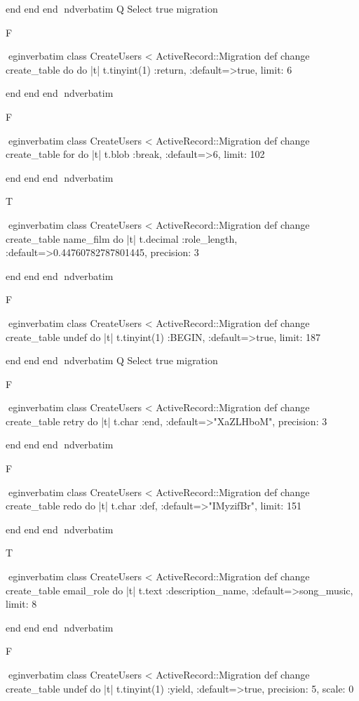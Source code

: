     end 
  end 
end
nd{verbatim}
Q
 Select true migration

F

egin{verbatim}
 class CreateUsers < ActiveRecord::Migration 
  def change 
    create_table do do |t| 
      t.tinyint(1) :return, :default=>true, limit: 6
    
    end 
  end 
end
nd{verbatim}

F

egin{verbatim}
 class CreateUsers < ActiveRecord::Migration 
  def change 
    create_table for do |t| 
      t.blob :break, :default=>6, limit: 102
    
    end 
  end 
end
nd{verbatim}

T

egin{verbatim}
 class CreateUsers < ActiveRecord::Migration 
  def change 
    create_table name_film do |t| 
      t.decimal :role_length, :default=>0.44760782787801445, precision: 3
    
    end 
  end 
end
nd{verbatim}

F

egin{verbatim}
 class CreateUsers < ActiveRecord::Migration 
  def change 
    create_table undef do |t| 
      t.tinyint(1) :BEGIN, :default=>true, limit: 187
    
    end 
  end 
end
nd{verbatim}
Q
 Select true migration

F

egin{verbatim}
 class CreateUsers < ActiveRecord::Migration 
  def change 
    create_table retry do |t| 
      t.char :end, :default=>"XaZLHboM", precision: 3
    
    end 
  end 
end
nd{verbatim}

F

egin{verbatim}
 class CreateUsers < ActiveRecord::Migration 
  def change 
    create_table redo do |t| 
      t.char :def, :default=>"IMyzifBr", limit: 151
    
    end 
  end 
end
nd{verbatim}

T

egin{verbatim}
 class CreateUsers < ActiveRecord::Migration 
  def change 
    create_table email_role do |t| 
      t.text :description_name, :default=>song_music, limit: 8
    
    end 
  end 
end
nd{verbatim}

F

egin{verbatim}
 class CreateUsers < ActiveRecord::Migration 
  def change 
    create_table undef do |t| 
      t.tinyint(1) :yield, :default=>true, precision: 5, scale: 0
    
